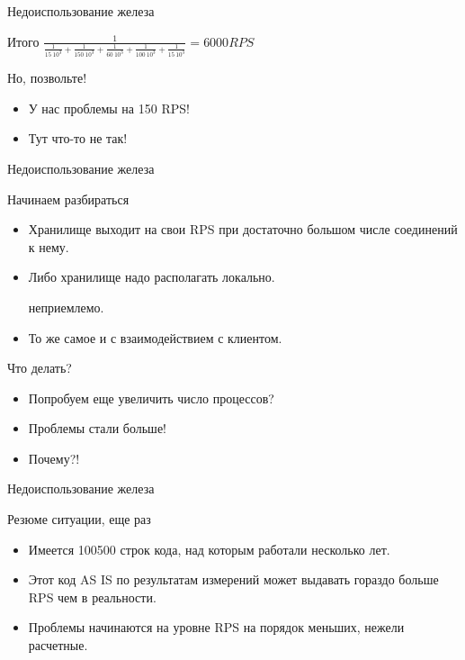 \documentclass[aspectratio=169]{beamer}
\begin{document}
\begin{frame}{Недоиспользование железа}
    \begin{block}{Итого}
        {\huge
            $\frac{1}{\frac{1}{15 \ 10^3} + \frac{1}{150 \ 10^3} + \frac{1}{60 \ 10^3}+\frac{1}{100 \ 10^3}+\frac{1}{15 \ 10^3}} = 6000 RPS$
        }
    \end{block}

    \pause
    \begin{block}{Но, позвольте!}
        \begin{itemize}
            \pause\item У нас проблемы на 150 RPS!
            \pause\item Тут что-то не так!
        \end{itemize}
    \end{block}
\end{frame}


\begin{frame}{Недоиспользование железа}
    \begin{block}{Начинаем разбираться}
        \begin{itemize}
            \pause\item Хранилище выходит на свои RPS при достаточно большом
                числе соединений к нему.
            \pause\item Либо хранилище надо располагать локально.
                \pause\par {\small неприемлемо.}
            \pause\item То же самое и с взаимодействием с клиентом.
        \end{itemize}
    \end{block}

    \pause
    \begin{block}{Что делать?}
        \begin{itemize}
            \pause\item Попробуем еще увеличить число процессов?
            \pause\item Проблемы стали больше!
            \pause\item Почему?!
        \end{itemize}
    \end{block}
\end{frame}

\begin{frame}{Недоиспользование железа}
    \begin{block}{Резюме ситуации, еще раз}
        \begin{itemize}
            \pause\item Имеется 100500 строк кода,
                над которым работали несколько лет.

            \pause\item Этот код AS IS по результатам измерений
                может выдавать гораздо больше RPS чем в реальности.

            \pause\item Проблемы начинаются на уровне RPS на порядок меньших,
                нежели расчетные.
        \end{itemize}
    \end{block}
\end{frame}
\end{document}
